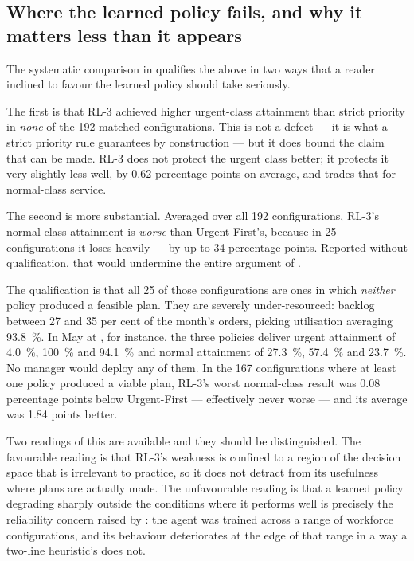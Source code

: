 \subsection{Where the learned policy fails, and why it matters less than it appears}
\label{sec:disc-rl-failure}

The systematic comparison in  qualifies the above in two ways that a
reader inclined to favour the learned policy should take seriously.

The first is that RL-3 achieved higher urgent-class attainment than strict priority in
\emph{none} of the 192 matched configurations. This is not a defect --- it is what a strict
priority rule guarantees by construction --- but it does bound the claim that can be made. RL-3
does not protect the urgent class better; it protects it very slightly less well, by
\num{0.62} percentage points on average, and trades that for normal-class service.

The second is more substantial. Averaged over all 192 configurations, RL-3's normal-class
attainment is \emph{worse} than Urgent-First's, because in 25 configurations it loses heavily
--- by up to 34 percentage points. Reported without qualification, that would undermine the
entire argument of .

The qualification is that all 25 of those configurations are ones in which \emph{neither} policy
produced a feasible plan. They are severely under-resourced: backlog between 27 and 35 per cent
of the month's orders, picking utilisation averaging \SI{93.8}{\percent}. In May at
, for instance, the three policies deliver urgent attainment of \SI{4.0}{\percent},
\SI{100}{\percent} and \SI{94.1}{\percent} and normal attainment of \SI{27.3}{\percent},
\SI{57.4}{\percent} and \SI{23.7}{\percent}. No manager would deploy any of them. In the 167
configurations where at least one policy produced a viable plan, RL-3's worst normal-class
result was \num{0.08} percentage points below Urgent-First --- effectively never worse --- and
its average was \num{1.84} points better.

Two readings of this are available and they should be distinguished. The favourable reading is
that RL-3's weakness is confined to a region of the decision space that is irrelevant to
practice, so it does not detract from its usefulness where plans are actually made. The
unfavourable reading is that a learned policy degrading sharply outside the conditions where it
performs well is precisely the reliability concern raised by \citet{waubert2022}: the agent was
trained across a range of workforce configurations, and its behaviour deteriorates at the edge
of that range in a way a two-line heuristic's does not.

